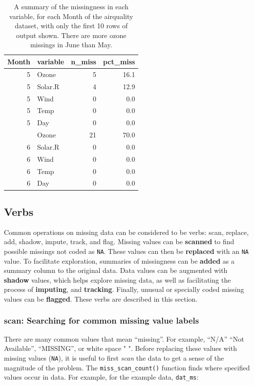 \documentclass[]{article}
\theoremstyle{definition}
\theoremstyle{definition}
\theoremstyle{definition}
\theoremstyle{remark}
\begin{document}
\begin{table}[!h]

\caption{\label{tab:group-miss-var-summary}A summary of the missingness in each variable, for each Month of the airquality dataset, with only the first 10 rows of output shown. There are more ozone missings in June than May.}
\centering
\begin{tabular}[t]{rlrr}
\toprule
Month & variable & n\_miss & pct\_miss\\
\midrule
5 & Ozone & 5 & 16.1\\
5 & Solar.R & 4 & 12.9\\
5 & Wind & 0 & 0.0\\
5 & Temp & 0 & 0.0\\
5 & Day & 0 & 0.0\\
\addlinespace
6 & Ozone & 21 & 70.0\\
6 & Solar.R & 0 & 0.0\\
6 & Wind & 0 & 0.0\\
6 & Temp & 0 & 0.0\\
6 & Day & 0 & 0.0\\
\bottomrule
\end{tabular}
\end{table}

\hypertarget{verbs}{%
\subsection{Verbs}\label{verbs}}

Common operations on missing data can be considered to be verbs: scan,
replace, add, shadow, impute, track, and flag. Missing values can be
\textbf{scanned} to find possible missings not coded as \texttt{NA}.
These values can then be \textbf{replaced} with an \texttt{NA} value. To
facilitate exploration, summaries of missingness can be \textbf{added}
as a summary column to the original data. Data values can be augmented
with \textbf{shadow} values, which helps explore missing data, as well
as facilitating the process of \textbf{imputing}, and \textbf{tracking}.
Finally, unusual or specially coded missing values can be
\textbf{flagged}. These verbs are described in this section.

\hypertarget{verbs-search}{%
\subsubsection{scan: Searching for common missing value
labels}\label{verbs-search}}

There are many common values that mean ``missing''. For example, ``N/A''
``Not Available'', ``MISSING'', or white space " ". Before replacing
these values with missing values (\texttt{NA}), it is useful to first
\emph{scan} the data to get a sense of the magnitude of the problem. The
\texttt{miss\_scan\_count()} function finds where specified values occur
in data. For example, for the example data, \texttt{dat\_ms}:
\end{document}
